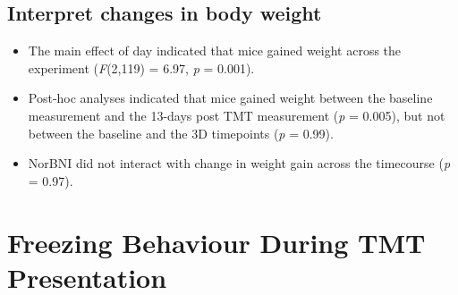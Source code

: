 \documentclass[
]{book}
\begin{document}
\hypertarget{interpret-changes-in-body-weight}{%
\section{Interpret changes in body weight}\label{interpret-changes-in-body-weight}}

\begin{itemize}
\item
  The main effect of day indicated that mice gained weight across the experiment (\emph{F}(2,119) = 6.97, \emph{p} = 0.001).
\item
  Post-hoc analyses indicated that mice gained weight between the baseline measurement and the 13-days post TMT measurement (\emph{p} = 0.005), but not between the baseline and the 3D timepoints (\emph{p} = 0.99).
\item
  NorBNI did not interact with change in weight gain across the timecourse (\emph{p} = 0.97).
\end{itemize}

\hypertarget{freezing-behaviour-during-tmt-presentation}{%
\chapter{Freezing Behaviour During TMT Presentation}\label{freezing-behaviour-during-tmt-presentation}}
\end{document}
